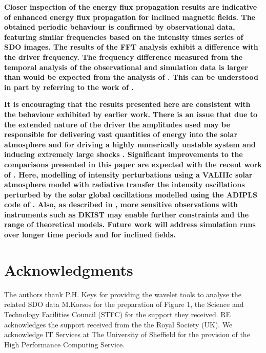 \documentclass[linenumbers]{aastex63}
\newcommand{\bcr}{\bf\color{red}} %
\begin{document}
{\bcr
 Closer inspection of the energy flux propagation results are indicative of enhanced energy flux propagation for inclined magnetic fields. The obtained periodic behaviour is confirmed by observational data, featuring similar frequencies based on the intensity times series of SDO images. The results of the FFT analysis exhibit a difference with the driver frequency. The frequency difference measured from the temporal analysis of the observational and simulation data is larger than would be expected from the analysis of \citet{Hindman1996}. This can be understood in part by referring to the work of \citet{Campbell1989}.
}

{\bcr
It is encouraging that the results presented here are consistent with the behaviour exhibited  by earlier work. There is an issue that due to the extended nature of the driver the amplitudes used may be responsible for delivering vast quantities of energy into the solar atmosphere and for driving a highly numerically unstable system and inducing extremely large shocks \citet{Santamaria2015}. Significant improvements to the comparisons presented in this paper are expected with the  recent work of \citet{Kostogryz2021}. Here, modelling of intensity perturbations using a VALIIIc solar atmosphere model with radiative transfer the intensity oscillations perturbed by the solar global oscillations modelled using the ADIPLS code of \citet{Christensen-Dalsgaard2008}. Also, as described in \citet{Rast2016}, more sensitive observations with instruments such as DKIST may enable further constraints and the range of theoretical models. Future work will address simulation runs over longer time periods and for inclined fields. 
}


\section{Acknowledgments}

The authors thank P.H. Keys for providing the wavelet tools to analyse the related SDO data M.Korsos for the preparation of Figure 1, the Science and Technology Facilities Council (STFC) for the support they received.  RE acknowledges the support received from the the Royal Society (UK). We acknowledge IT Services at The University of Sheffield for the provision of the High Performance Computing Service.
\end{document}

